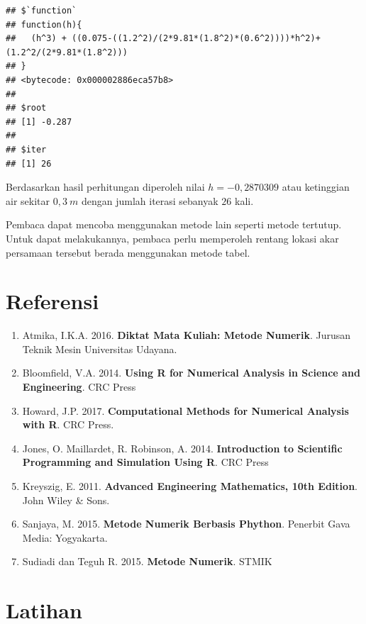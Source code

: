 \documentclass[
]{book}
\providecommand{\tightlist}{%
  \setlength{\itemsep}{0pt}\setlength{\parskip}{0pt}}
\theoremstyle{definition}
\theoremstyle{definition}
\theoremstyle{definition}
\theoremstyle{definition}
\theoremstyle{remark}
\begin{document}
\begin{verbatim}
## $`function`
## function(h){
##   (h^3) + ((0.075-((1.2^2)/(2*9.81*(1.8^2)*(0.6^2))))*h^2)+ (1.2^2/(2*9.81*(1.8^2)))
## }
## <bytecode: 0x000002886eca57b8>
## 
## $root
## [1] -0.287
## 
## $iter
## [1] 26
\end{verbatim}

Berdasarkan hasil perhitungan diperoleh nilai \(h=-0,2870309\) atau ketinggian air sekitar \(0,3\ m\) dengan jumlah iterasi sebanyak \(26\) kali.

Pembaca dapat mencoba menggunakan metode lain seperti metode tertutup. Untuk dapat melakukannya, pembaca perlu memperoleh rentang lokasi akar persamaan tersebut berada menggunakan metode tabel.

\hypertarget{referensi-2}{%
\section{Referensi}\label{referensi-2}}

\begin{enumerate}
\def\labelenumi{\arabic{enumi}.}
\tightlist
\item
  Atmika, I.K.A. 2016. \textbf{Diktat Mata Kuliah: Metode Numerik}. Jurusan Teknik Mesin Universitas Udayana.
\item
  Bloomfield, V.A. 2014. \textbf{Using R for Numerical Analysis in Science and Engineering}. CRC Press
\item
  Howard, J.P. 2017. \textbf{Computational Methods for Numerical Analysis with R}. CRC Press.
\item
  Jones, O. Maillardet, R. Robinson, A. 2014. \textbf{Introduction to Scientific Programming and Simulation Using R}. CRC Press
\item
  Kreyszig, E. 2011. \textbf{Advanced Engineering Mathematics, 10th Edition}. John Wiley \& Sons.
\item
  Sanjaya, M. 2015. \textbf{Metode Numerik Berbasis Phython}. Penerbit Gava Media: Yogyakarta.
\item
  Sudiadi dan Teguh R. 2015. \textbf{Metode Numerik}. STMIK
\end{enumerate}

\hypertarget{latihan-1}{%
\section{Latihan}\label{latihan-1}}
\end{document}
